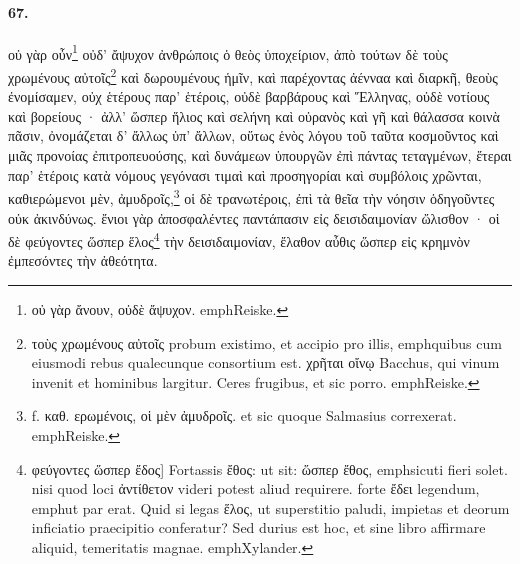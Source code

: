\documentclass[a4paper, 11pt, oneside, polutonikogreek, german]{article}
\begin{document}
\paragraph{67.}
οὐ γὰρ οὖν\footnote{οὐ γὰρ ἄνουν, οὐδὲ ἄψυχον. emph{Reiske.}} οὐδ' ἄψυχον ἀνθρώποις ὁ θεὸς ὑποχείριον, ἀπὸ τούτων δὲ τοὺς χρωμένους αὐτοῖς\footnote{τοὺς χρωμένους αὐτοῖς probum existimo, et accipio pro illis, emph{quibus cum eiusmodi rebus qualecunque consortium est.} χρῆται οἴνῳ Bacchus, qui vinum invenit et hominibus largitur. Ceres frugibus, et sic porro. emph{Reiske.}} καὶ δωρουμένους ἡμῖν, καὶ παρέχοντας ἀένναα καὶ διαρκῆ, θεοὺς ἐνομίσαμεν, οὐχ ἑτέρους παρ' ἑτέροις, οὐδὲ βαρβάρους καὶ Ἕλληνας, οὐδὲ νοτίους καὶ βορείους · ἀλλ' ὥσπερ ἥλιος καὶ σελήνη καὶ οὐρανὸς καὶ γῆ καὶ θάλασσα κοινὰ πᾶσιν, ὀνομάζεται δ' ἄλλως ὑπ' ἄλλων, οὕτως ἑνὸς λόγου τοῦ ταῦτα κοσμοῦντος καὶ μιᾶς προνοίας ἐπιτροπευούσης, καὶ δυνάμεων ὑπουργῶν ἐπὶ πάντας τεταγμένων, ἕτεραι παρ' ἑτέροις κατὰ νόμους γεγόνασι τιμαὶ καὶ προσηγορίαι καὶ συμβόλοις χρῶνται, καθιερώμενοι μὲν, ἀμυδροῖς,\footnote{f. καθ. ερωμένοις, οἱ μὲν ἀμυδροῖς. et sic quoque Salmasius correxerat. emph{Reiske.}} οἱ δὲ τρανωτέροις, ἐπὶ τὰ θεῖα τὴν νόησιν ὁδηγοῦντες οὐκ ἀκινδύνως. ἔνιοι γὰρ ἀποσφαλέντες παντάπασιν εἰς δεισιδαιμονίαν ὤλισθον · οἱ δὲ φεύγοντες ὥσπερ ἕλος\footnote{φεύγοντες ὥσπερ ἔδος] Fortassis ἔθος: ut sit: ὥσπερ ἔθος, emph{sicuti fieri solet}. nisi quod loci ἀντίθετον videri potest aliud requirere. forte ἔδει legendum, emph{ut par erat}. Quid si legas ἕλος, ut superstitio paludi, impietas et deorum inficiatio praecipitio conferatur? Sed durius est hoc, et sine libro affirmare aliquid, temeritatis magnae. emph{Xylander.} } τὴν δεισιδαιμονίαν, ἔλαθον αὖθις ὥσπερ εἰς κρημνὸν ἐμπεσόντες τὴν ἀθεότητα.
\end{document}
